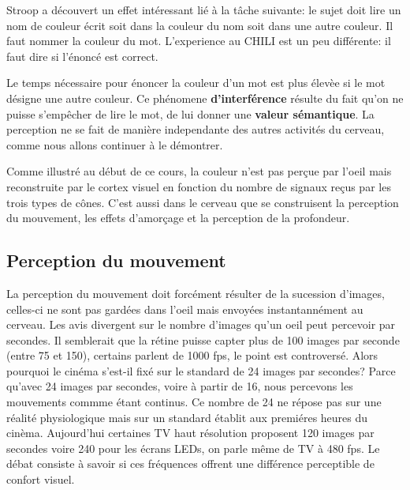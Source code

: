 \begin{figure}[H]
\centering
{}
\end{figure}

Stroop a d\'ecouvert un effet int\'eressant li\'e \`a la t\^ache suivante: le sujet doit lire un nom de couleur \'ecrit soit dans la couleur du nom soit dans une autre couleur. Il faut nommer la couleur du mot. L'experience au CHILI est un peu diff\'erente: il faut dire si l'\'enonc\'e est correct. 

Le temps n\'ecessaire pour \'enoncer la couleur d'un mot est plus \'elev\`ee si le mot d\'esigne une autre couleur. Ce ph\'enomene \textbf{d'interf\'erence} r\'esulte du fait qu'on ne puisse s'emp\^echer de lire le mot, de lui donner une \textbf{valeur s\'emantique}. La perception ne se fait de mani\`ere independante des autres activit\'es du cerveau, comme nous allons continuer \`a le d\'emontrer.

Comme illustr\'e au d\'ebut de ce cours, la couleur n'est pas per\c{c}ue par l'oeil mais reconstruite par le cortex visuel en fonction du nombre de signaux re\c{c}us par les trois types de c\^ones. C'est aussi dans le cerveau que se construisent la perception du mouvement, les effets d'amor\c{c}age et la perception de la profondeur.

\subsection{Perception du mouvement}

La perception du mouvement doit forc\'ement r\'esulter de la sucession d'images, celles-ci ne sont pas gard\'ees dans l'oeil mais envoy\'ees instantann\'ement au cerveau. Les avis divergent sur le nombre d'images qu'un oeil peut percevoir par secondes. Il semblerait que la r\'etine puisse capter plus de 100 images par seconde (entre 75 et 150), certains parlent de 1000 fps, le point est controvers\'e. Alors pourquoi le cin\'ema s'est-il fix\'e sur le standard de 24 images par secondes? Parce qu'avec 24 images par secondes, voire \`a partir de 16, nous percevons les mouvements commme \'etant continus. Ce nombre de 24 ne r\'epose pas sur une r\'ealit\'e physiologique mais sur un standard \'etablit aux premi\'eres heures du cin\`ema. Aujourd'hui certaines TV haut r\'esolution proposent 120 images par secondes voire 240 pour les \'ecrans LEDs, on parle m\^eme de TV \`a 480 fps. Le d\'ebat consiste \`a savoir si ces fr\'equences offrent une diff\'erence perceptible de confort visuel.

